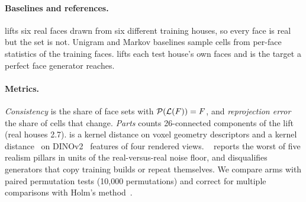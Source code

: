 \paragraph{Baselines and references.}
\patchwork{} lifts six real faces drawn from six different training houses, so every face is real but
the set is not. Unigram and Markov baselines sample cells from per-face statistics of the training
faces. \shellref{} lifts each test house's own faces and is the target a perfect face generator reaches.

\paragraph{Metrics.}
\emph{Consistency} is the share of face sets with $\mathcal{P}(\mathcal{L}(F)) = F$, and \emph{reprojection error}
the share of cells that change. \emph{Parts} counts 26-connected components of the lift (real houses
2.7). \geomkid{} is a kernel distance on voxel geometry descriptors and \mvkid{} a kernel
distance~\citep{binkowski2018kid} on DINOv2~\citep{oquab2024dinov2} features of four rendered views.
\blockscore{}~\citep{anonymous2027blindness} reports the worst of five realism pillars in units of the
real-versus-real noise floor, and disqualifies generators that copy training builds or repeat
themselves. We compare arms with paired permutation tests (10{,}000 permutations) and correct for
multiple comparisons with Holm's method~\citep{holm1979simple}. 
